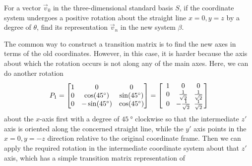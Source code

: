 \begin{exmp}
\label{ex:rotateyz}
For a vector $\vec{v}_0$ in the three-dimensional standard basis $S$, if the coordinate system undergoes a positive rotation about the straight line $x = 0, y = z$ by a degree of $\theta$, find its representation $\vec{v}_n$ in the new system $\beta$.
\end{exmp}
\begin{solution}
The common way to construct a transition matrix is to find the new axes in terms of the old coordinates. However, in this case, it is harder because the axis about which the rotation occurs is not along any of the main axes. Here, we can do another rotation 
\begin{align*}
P_1 = 
\begin{bmatrix}
1 & 0 & 0 \\
0 & \cos(\SI{45}{\degree}) & \sin(\SI{45}{\degree}) \\
0 & -\sin(\SI{45}{\degree}) & \cos(\SI{45}{\degree})
\end{bmatrix}
=
\left[\begin{array}{@{\,}wc{12pt}wc{12pt}wc{12pt}@{\,}}
1 & 0 & 0 \\
0 & \frac{1}{\sqrt{2}} & \frac{1}{\sqrt{2}} \\
0 & -\frac{1}{\sqrt{2}} & \frac{1}{\sqrt{2}}
\end{array}\right]
\end{align*}
about the $x$-axis first with a degree of $\SI{45}{\degree}$ clockwise so that the intermediate $z'$ axis is oriented along the concerned straight line, while the $y'$ axis points in the $x = 0, y = -z$ direction relative to the original coordinate frame. Then we can apply the required rotation in the intermediate coordinate system about that $z'$ axis, which has a simple transition matrix representation of
\end{solution}
